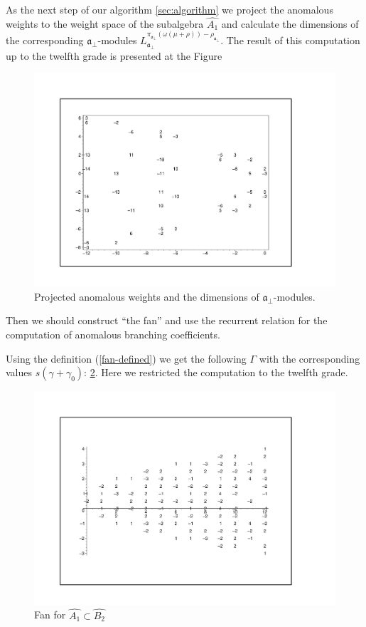 \documentclass[a4paper,12pt]{article}
\theoremstyle{definition} \newtheorem{Def}{Definition}
\begin{document}
As the next step of our algorithm \ref{sec:algorithm} we project the anomalous weights to the weight space of the subalgebra $\hat{A_1}$ and calculate the dimensions of the corresponding $\mathfrak{a}_{\bot}$-modules $L^{\pi_{\mathfrak{a}_{\bot}}(\omega(\mu+\rho))-\rho_{\mathfrak{a}_{\bot}}}_{\mathfrak{a}_{\bot}}$.
The result of this computation up to the twelfth grade is presented at the Figure
\begin{figure}[h!tb]
  \centering
  \includegraphics[width=150mm]{AffineB2_A1_proj_anom.pdf}
  \caption{Projected anomalous weights and the dimensions of $\mathfrak{a}_{\bot}$-modules.}
  \label{fig:AffineB2_A1_anom_proj}
\end{figure}

Then we should construct ``the fan'' and use the recurrent relation for the computation of anomalous branching coefficients.

Using the definition (\ref{fan-defined}) we get the following $\Gamma$ with the corresponding values $s(\gamma+\gamma_0)$: \ref{fig:AffineB2A1Fan}.
Here we restricted the computation to the twelfth grade.
\begin{figure}[ph]
  \centering
  \includegraphics[width=130mm]{AffineB2_A1_fan.pdf}
  \caption{Fan for $\hat{A_1}\subset \hat{B_2}$}
  \label{fig:AffineB2A1Fan}
\end{figure}
\end{document}
